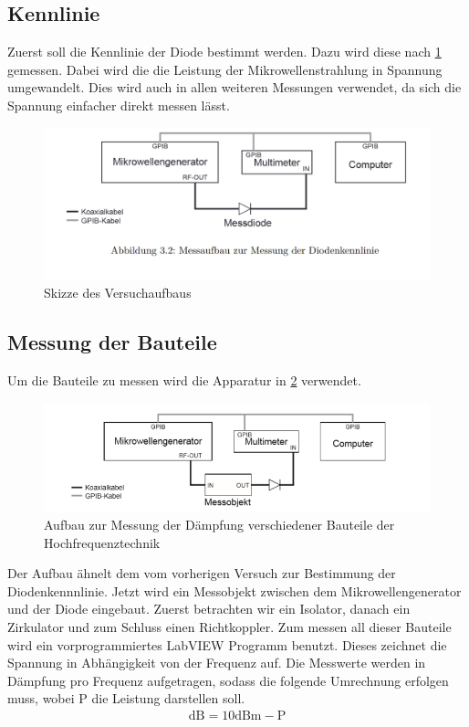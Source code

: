 \subsection{Kennlinie}
Zuerst soll die Kennlinie der Diode bestimmt werden. Dazu wird diese nach \cref{Aufbau} gemessen. Dabei wird die die Leistung der Mikrowellenstrahlung in Spannung umgewandelt. Dies wird auch in allen weiteren Messungen verwendet, da sich die Spannung einfacher direkt messen lässt.

\begin{figure}[h]
	\centering
	\includegraphics[scale=0.4]{Diode_Aufbau.PNG}
	\caption{Skizze des Versuchaufbaus}
	\label{Aufbau}
\end{figure}

\subsection{Messung der Bauteile}
Um die Bauteile zu messen wird die Apparatur in \cref{Mess} verwendet.
\begin{figure}[h!]
	\centering
	\includegraphics[scale = 1]{Mess.png}
	\caption{Aufbau zur Messung der Dämpfung verschiedener Bauteile der Hochfrequenztechnik}
	\label{Mess}
\end{figure}
Der Aufbau ähnelt dem vom vorherigen Versuch zur Bestimmung der Diodenkennnlinie. Jetzt wird ein Messobjekt zwischen dem Mikrowellengenerator und der Diode eingebaut. Zuerst betrachten wir ein Isolator, danach ein Zirkulator und zum Schluss einen Richtkoppler. Zum messen all dieser Bauteile wird ein vorprogrammiertes LabVIEW Programm benutzt. Dieses zeichnet die Spannung in Abhängigkeit von der Frequenz auf. Die Messwerte werden in Dämpfung pro Frequenz aufgetragen, sodass die folgende Umrechnung erfolgen muss, wobei P die Leistung darstellen soll.
\begin{align}
	\text{dB} = 10\text{dBm} - \text{P}
	\label{F1}
\end{align}

